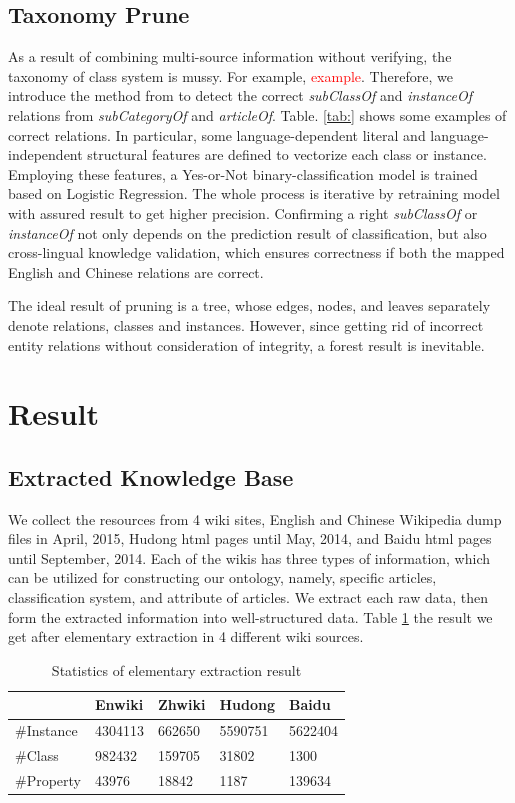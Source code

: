 \documentclass[runningheads,a4paper]{llncs}
\begin{document}
\subsection{Taxonomy Prune}
\label{sec:tp}
As a result of combining multi-source information without verifying, the taxonomy of class system is mussy. For example, \textcolor{red}{example}. Therefore, we introduce the method from\cite{wang2014cross} to detect the correct \textit{subClassOf} and \textit{instanceOf} relations from \textit{subCategoryOf} and \textit{articleOf}. Table. \ref{tab:} shows some examples of correct relations. In particular, some language-dependent literal and language-independent structural features are defined to vectorize each class or instance. Employing these features, a Yes-or-Not binary-classification model is trained based on Logistic Regression. The whole process is iterative by retraining model with assured result to get higher precision. Confirming a right \textit{subClassOf} or \textit{instanceOf} not only depends on the prediction result of classification, but also cross-lingual knowledge validation, which ensures correctness if both the mapped English and Chinese relations are correct. 

The ideal result of pruning is a tree, whose edges, nodes, and leaves separately denote relations, classes and instances. However, since getting rid of incorrect entity relations without consideration of integrity, a forest result is inevitable. 

\section{Result}
\label{sec:result}

\subsection{Extracted Knowledge Base}
We collect the resources from 4 wiki sites, English and Chinese Wikipedia dump files in April, 2015, Hudong html pages until May, 2014, and Baidu html pages until September, 2014. Each of the wikis has three types of information, which can be utilized for constructing our ontology, namely, specific articles, classification system, and attribute of articles. We extract each raw data, then form the extracted information into well-structured data. Table \ref{tab:extract-result} the result we get after elementary extraction in 4 different wiki sources.

\begin{table}[h]
\small
\centering
\caption{Statistics of elementary extraction result}
\label{tab:extract-result}
    \begin{tabular}{|l|l|l|l|l|}
        \hline
                 & Enwiki  & Zhwiki & Hudong  & Baidu   \\ \hline
        \#Instance & 4304113 & 662650 & 5590751 & 5622404 \\ \hline
        \#Class  & 982432  & 159705 & 31802   & 1300    \\ \hline
        \#Property & 43976   & 18842  & 1187    & 139634  \\ \hline
    \end{tabular}
\end{table}
\end{document}
